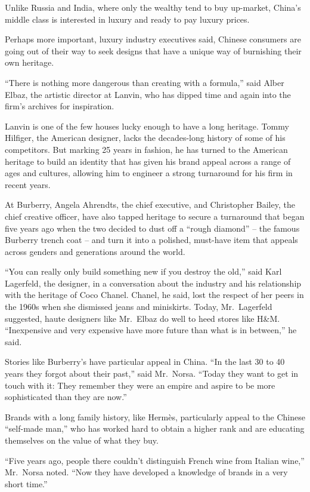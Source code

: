 ﻿\documentclass[12pt]{article}
\begin{document}
Unlike Russia and India, where only the wealthy tend to buy up-market, China's middle class is
interested in luxury and ready to pay luxury prices.

Perhaps more important, luxury industry executives said, Chinese consumers are going out of their
way to seek designs that have a unique way of burnishing their own heritage.

``There is nothing more dangerous than creating with a formula,'' said Alber Elbaz, the artistic
director at Lanvin, who has dipped time and again into the firm's archives for inspiration.

Lanvin is one of the few houses lucky enough to have a long heritage. Tommy Hilfiger, the American
designer, lacks the decades-long history of some of his competitors. But marking 25 years in
fashion, he has turned to the American heritage to build an identity that has given his brand appeal
across a range of ages and cultures, allowing him to engineer a strong turnaround for his firm in
recent years.

At Burberry, Angela Ahrendts, the chief executive, and Christopher Bailey, the chief creative
officer, have also tapped heritage to secure a turnaround that began five years ago when the two
decided to dust off a ``rough diamond'' -- the famous Burberry trench coat -- and turn it into a
polished, must-have item that appeals across genders and generations around the world.

``You can really only build something new if you destroy the old,'' said Karl Lagerfeld, the
designer, in a conversation about the industry and his relationship with the heritage of Coco
Chanel. Chanel, he said, lost the respect of her peers in the 1960s when she dismissed jeans and
miniskirts. Today, Mr.~Lagerfeld suggested, haute designers like Mr.~Elbaz do well to heed stores
like H\&M. ``Inexpensive and very expensive have more future than what is in between,'' he said.

Stories like Burberry's have particular appeal in China. ``In the last 30 to 40 years they forgot
about their past,'' said Mr.~Norsa. ``Today they want to get in touch with it: They remember they
were an empire and aspire to be more sophisticated than they are now.''

Brands with a long family history, like Herm\`es, particularly appeal to the Chinese ``self-made
man,'' who has worked hard to obtain a higher rank and are educating themselves on the value of what
they buy.

``Five years ago, people there couldn't distinguish French wine from Italian wine,'' Mr.~Norsa
noted. ``Now they have developed a knowledge of brands in a very short time.''
\end{document}
